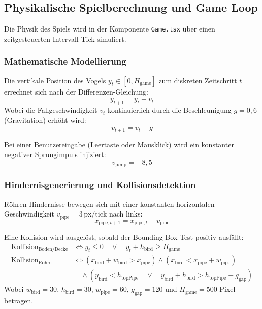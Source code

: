 \documentclass[12pt,a4paper]{article}
\begin{document}
\subsection{Physikalische Spielberechnung und Game Loop}
Die Physik des Spiels wird in der Komponente \texttt{Game.tsx} über einen zeitgesteuerten Intervall-Tick simuliert.

\subsubsection{Mathematische Modellierung}
Die vertikale Position des Vogels $y_t \in [0, H_{\text{game}}]$ zum diskreten Zeitschritt $t$ errechnet sich nach der Differenzen-Gleichung:
\begin{equation}
  y_{t+1} = y_t + v_t
\end{equation}
Wobei die Fallgeschwindigkeit $v_t$ kontinuierlich durch die Beschleunigung $g = 0{,}6$ (Gravitation) erhöht wird:
\begin{equation}
  v_{t+1} = v_t + g
\end{equation}

Bei einer Benutzereingabe (Leertaste oder Mausklick) wird ein konstanter negativer Sprungimpuls injiziert:
\begin{equation}
  v_{\text{jump}} = -8{,}5
\end{equation}

\subsubsection{Hindernisgenerierung und Kollisionsdetektion}
Röhren-Hindernisse bewegen sich mit einer konstanten horizontalen Geschwindigkeit $v_{\text{pipe}} = 3\,\text{px/tick}$ nach links:
\begin{equation}
  x_{\text{pipe}, t+1} = x_{\text{pipe}, t} - v_{\text{pipe}}
\end{equation}

Eine Kollision wird ausgelöst, sobald der Bounding-Box-Test positiv ausfällt:
\begin{align}
  \text{Kollision}_{\text{Boden/Decke}} &\iff y_t \le 0 \quad \lor \quad y_t + h_{\text{bird}} \ge H_{\text{game}} \\
  \text{Kollision}_{\text{Röhre}} &\iff (x_{\text{bird}} + w_{\text{bird}} > x_{\text{pipe}}) \land (x_{\text{bird}} < x_{\text{pipe}} + w_{\text{pipe}}) \nonumber \\
  &\quad \land \left( y_{\text{bird}} < h_{\text{topPipe}} \quad \lor \quad y_{\text{bird}} + h_{\text{bird}} > h_{\text{topPipe}} + g_{\text{gap}} \right)
\end{align}
Wobei $w_{\text{bird}} = 30$, $h_{\text{bird}} = 30$, $w_{\text{pipe}} = 60$, $g_{\text{gap}} = 120$ und $H_{\text{game}} = 500$ Pixel betragen.
\end{document}
